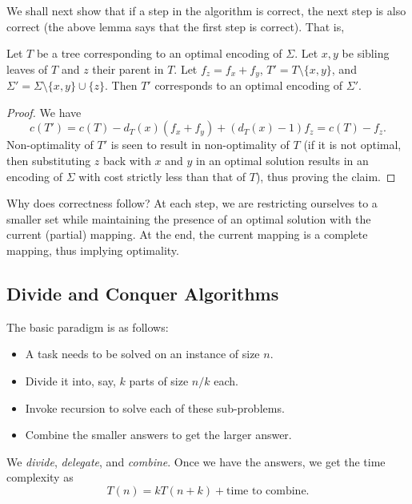 We shall next show that if a step in the algorithm is correct, the next step is also correct (the above lemma says that the first step is correct). That is,

\begin{lemma*}
	Let $T$ be a tree corresponding to an optimal encoding of $\Sigma$. Let $x,y$ be sibling leaves of $T$ and $z$ their parent in $T$. Let $f_z=f_x+f_y$, $T'=T\setminus\{x,y\}$, and $\Sigma'=\Sigma\setminus\{x,y\}\cup\{z\}$. Then $T'$ corresponds to an optimal encoding of $\Sigma'$.
\end{lemma*}
\begin{proof}
	We have
	\[ c(T') = c(T) - d_T(x)(f_x+f_y) + (d_T(x)-1)f_z = c(T) - f_z. \]
	Non-optimality of $T'$ is seen to result in non-optimality of $T$ (if it is not optimal, then substituting $z$ back with $x$ and $y$ in an optimal solution results in an encoding of $\Sigma$ with cost strictly less than that of $T$), thus proving the claim.
\end{proof}

Why does correctness follow? At each step, we are restricting ourselves to a smaller set while maintaining the presence of an optimal solution with the current (partial) mapping. At the end, the current mapping is a complete mapping, thus implying optimality.

\subsection{Divide and Conquer Algorithms}


The basic paradigm is as follows:
\begin{itemize}
	\item A task needs to be solved on an instance of size $n$.
	\item Divide it into, say, $k$ parts of size $n/k$ each.
	\item Invoke recursion to solve each of these sub-problems.
	\item Combine the smaller answers to get the larger answer.
\end{itemize}

We \textit{divide}, \textit{delegate}, and \textit{combine}. Once we have the answers, we get the time complexity as
\[ T(n) = k T(n+k) + \text{time to combine}. \]

